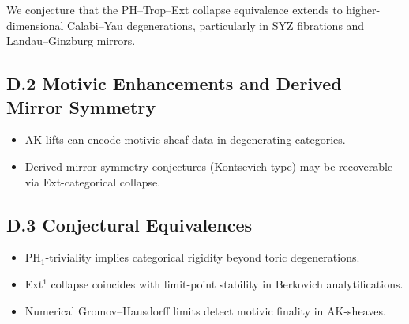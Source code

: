 \documentclass[11pt]{article}
\begin{document}
We conjecture that the PH–Trop–Ext collapse equivalence extends to higher-dimensional Calabi–Yau degenerations, particularly in SYZ fibrations and Landau–Ginzburg mirrors.

\subsection*{D.2 Motivic Enhancements and Derived Mirror Symmetry}

\begin{itemize}
    \item AK-lifts can encode motivic sheaf data in degenerating categories.
    \item Derived mirror symmetry conjectures (Kontsevich type) may be recoverable via Ext-categorical collapse.
\end{itemize}

\subsection*{D.3 Conjectural Equivalences}

\begin{itemize}
    \item PH$_1$-triviality implies categorical rigidity beyond toric degenerations.
    \item Ext$^1$ collapse coincides with limit-point stability in Berkovich analytifications.
    \item Numerical Gromov–Hausdorff limits detect motivic finality in AK-sheaves.
\end{itemize}
\end{document}
